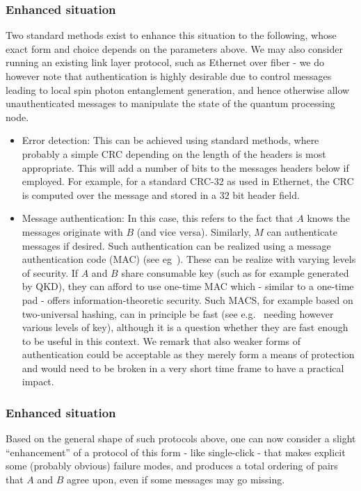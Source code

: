 \documentclass{article}
\begin{document}
\subsubsection{Enhanced situation}
Two standard methods exist to enhance this situation to the following, whose exact form and choice depends on the parameters above. We may also
consider running an existing link layer protocol, such as Ethernet over fiber - we do however note that authentication is highly desirable due
to control messages leading to local spin photon entanglement generation, and hence otherwise allow unauthenticated messages to manipulate the
state of the quantum processing node.
\begin{itemize}
\item Error detection: This can be achieved using standard methods, where probably a simple CRC depending on the length of the headers is most appropriate. This will add a number of bits to the messages headers below if employed. For example, for a standard CRC-32 as used in Ethernet, the CRC is computed over the message and stored in a $32$ bit header field.
\item Message authentication: In this case, this refers to the fact that $A$ knows the messages originate with $B$ (and vice versa).
Similarly, $M$ can authenticate messages if desired. Such authentication can be realized using a message authentication code (MAC) (see eg~\cite{UMAC}). These can be realize with varying levels of security. If $A$ and $B$ share consumable key (such as for example generated by QKD), they can afford to use one-time MAC which - similar to a one-time pad - offers information-theoretic security. Such MACS, for example based on two-universal hashing,  can in principle be fast (see e.g.~\cite{UMAC} needing however various levels of key), although it is a question whether they are fast enough to be useful in this context. We remark that also weaker forms of authentication could be acceptable as they merely form a means of protection and would need to be broken in a very short time frame to have a practical impact.
\end{itemize}

\subsubsection{Enhanced situation}

Based on the general shape of such protocols above, one can now consider a slight ``enhancement'' of a protocol of this form - like single-click -
that makes explicit some (probably obvious) failure modes, and produces a total ordering of pairs that $A$ and $B$ agree upon, even if some messages may go missing.
\end{document}
